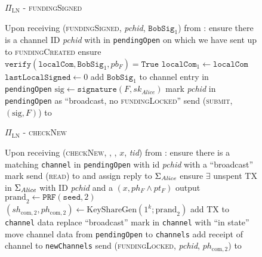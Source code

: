 \begin{figure}[!htbp]
  \begin{protocolbox}{$\Pi_{\mathrm{LN}}$ - \textsc{fundingSigned}}
    \begin{algorithmic}[1]
      \State Upon receiving (\textsc{fundingSigned}, \textit{pchid},
      $\mathtt{BobSig}_1$) from \bob:
      \Indent
        \State ensure there is a channel ID \textit{pchid} with \bob{} in
        \texttt{pendingOpen} on which we have sent up to \textsc{fundingCreated}
        \State ensure $\mathtt{verify}\left(\mathtt{localCom},
        \mathtt{BobSig}_1, pb_F\right) = \mathtt{True}$
        \State $\mathtt{localCom}_1 \gets \mathtt{localCom}$
        \State $\mathtt{lastLocalSigned} \gets 0$
        \State add $\mathtt{BobSig}_1$ to channel entry in \texttt{pendingOpen}
        \State $\mathrm{sig} \gets \mathtt{signature}\left(F,
        sk_{\mathit{Alice}}\right)$
        \State mark \textit{pchid} in \texttt{pendingOpen} as ``broadcast, no
        \textsc{fundingLocked}''
        \State send (\textsc{submit}, $\left(\mathrm{sig}, F\right)$) to \ledger
      \EndIndent
    \end{algorithmic}
  \end{protocolbox}
  \caption{}
  \label{alg:protocol:open:fundingSigned}
\end{figure}

\begin{figure}[!htbp]
  \begin{protocolbox}{$\Pi_{\mathrm{LN}}$ - \textsc{checkNew}}
    \begin{algorithmic}[1]
      \State {}
      \State Upon receiving (\textsc{checkNew}, \alice, \bob, $x$, \textit{tid})
      from \environment: 
      \Indent
        \State ensure there is a matching \texttt{channel} in
        \texttt{pendingOpen} with id \textit{pchid} with a ``broadcast'' mark
        \State send (\textsc{read}) to \ledger{} and assign reply to
        $\Sigma_{\mathit{Alice}}$
        \State ensure $\exists$ unspent TX in $\Sigma_{\mathit{Alice}}$ with ID
        \textit{pchid} and a $\left(x, ph_F \wedge pt_F\right)$ output
        \State $\mathrm{prand}_2 \gets \texttt{PRF}\left(\mathtt{seed},
        2\right)$
        \State $\left(sh_{\mathrm{com}, 2}, ph_{\mathrm{com}, 2}\right) \gets
        \mathrm{KeyShareGen}\left(1^k; \mathrm{prand}_2\right)$
        \State add TX to \texttt{channel} data \State replace ``broadcast'' mark
        in \texttt{channel} with ``in state''
          \State move channel data from \texttt{pendingOpen} to
          \texttt{channels}
          \State add receipt of channel to \texttt{newChannels}
        \EndIf
        \State send (\textsc{fundingLocked}, \textit{pchid}, $ph_{\mathrm{com},
        2}$) to \bob{}
      \EndIndent
    \end{algorithmic}
  \end{protocolbox}
  \caption{}
  \label{alg:protocol:open:checkNew}
\end{figure}

